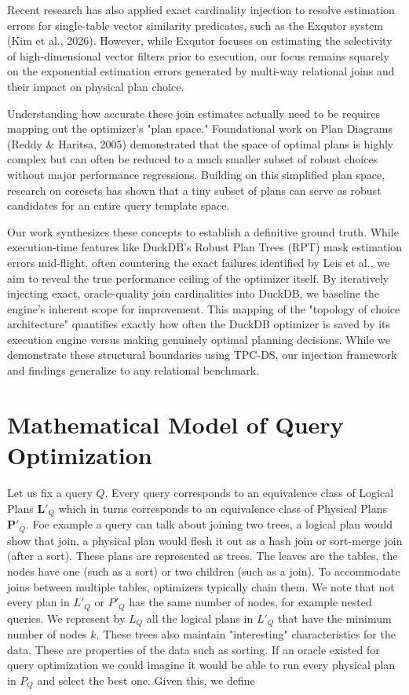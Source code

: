 \documentclass[sigconf,nonacm]{acmart}
\begin{document}
Recent research has also applied exact cardinality injection to resolve estimation errors for single-table vector similarity predicates, such as the Exqutor system (Kim et al., 2026). However, while Exqutor focuses on estimating the selectivity of high-dimensional vector filters prior to execution, our focus remains squarely on the exponential estimation errors generated by multi-way relational joins and their impact on physical plan choice.

Understanding how accurate these join estimates actually need to be requires mapping out the optimizer's "plan space." Foundational work on Plan Diagrams (Reddy & Haritsa, 2005) demonstrated that the space of optimal plans is highly complex but can often be reduced to a much smaller subset of robust choices without major performance regressions. Building on this simplified plan space, research on coresets has shown that a tiny subset of plans can serve as robust candidates for an entire query template space.

Our work synthesizes these concepts to establish a definitive ground truth. While execution-time features like DuckDB's Robust Plan Trees (RPT) mask estimation errors mid-flight, often countering the exact failures identified by Leis et al., we aim to reveal the true performance ceiling of the optimizer itself. By iteratively injecting exact, oracle-quality join cardinalities into DuckDB, we baseline the engine's inherent scope for improvement. This mapping of the "topology of choice architecture" quantifies exactly how often the DuckDB optimizer is saved by its execution engine versus making genuinely optimal planning decisions. While we demonstrate these structural boundaries using TPC-DS, our injection framework and findings generalize to any relational benchmark.

\section{Mathematical Model of Query Optimization}
Let us fix a query $Q$. Every query corresponds to an equivalence class of Logical Plans $\mathbf{L'}_Q$ which in turns corresponds to an equivalence class of Physical Plans $\mathbf{P'}_Q$. Foe example a query can talk about joining two trees, a logical plan would show that join, a physical plan would flesh it out as a hash join or sort-merge join (after a sort). These plans are represented as trees. The leaves are the tables, the nodes have one (such as a sort) or two children (such as a join). To accommodate joins between multiple tables, optimizers typically chain them. We note that not every plan in $L'_Q$ or $P'_Q$ has the same number of nodes, for example nested queries. We represent by $L_Q$ all the logical plans in $L'_Q$ that have the minimum number of nodes $k$. These trees also maintain "interesting" characteristics for the data. These are properties of the data such as sorting. 
If an oracle existed for query optimization we could imagine it would be able to run every physical plan in $P_Q$ and select the best one. Given this, we define 
\end{document}
